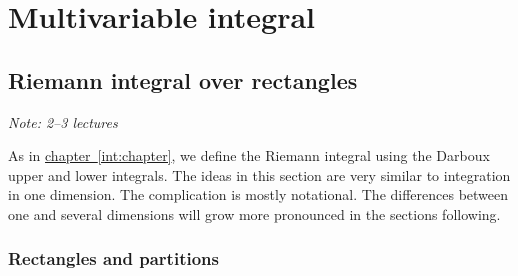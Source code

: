 \documentclass[12pt]{book}
\newcommand{\sectionnotes}[1]{\noindent \emph{Note: #1} \medskip \par}
\theoremstyle{plain}
\theoremstyle{remark}
\theoremstyle{definition}
\theoremstyle{exercise}
\theoremstyle{example}
\newcommand{\chapterref}[1]{\hyperref[#1]{chapter~\ref*{#1}}}
\begin{document}

\chapter{Multivariable integral} \label{mi:chapter}



\section{Riemann integral over rectangles}
\label{sec:rirect}

\sectionnotes{2--3 lectures}

As in \chapterref{int:chapter}, we define the Riemann integral using the Darboux
upper and lower integrals.  The ideas in this section are very similar to
integration in one dimension.  The complication is mostly notational.
The differences between one and several dimensions will grow more pronounced
in the sections following.

\subsection{Rectangles and partitions}
\end{document}
